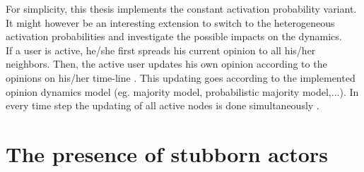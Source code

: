 \documentclass[11 pt , letterpaper , twoside , openright]{book}
\begin{document}
\newline
For simplicity, this thesis implements the constant activation probability variant. It might however be an interesting extension to switch to the heterogeneous activation probabilities and investigate the possible impacts on the dynamics. \\
\newline
If a user is active, he/she first spreads his current opinion to all his/her neighbors. Then, the active user updates his own opinion according to the opinions on his/her time-line \cite{Perra2019}. This updating goes according to the implemented opinion dynamics model (eg. majority model, probabilistic majority model,...). In every time step the updating of all active nodes is done simultaneously \cite{Perra2019}.
\newpage

\section{The presence of stubborn actors}\label{stubb}
\end{document}
